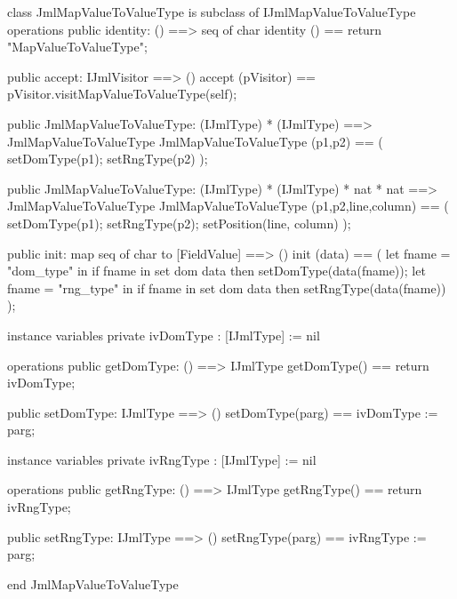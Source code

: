 \begin{vdm_al}
class JmlMapValueToValueType is subclass of IJmlMapValueToValueType
operations
  public identity: () ==> seq of char
  identity () == return "MapValueToValueType";

  public accept: IJmlVisitor ==> ()
  accept (pVisitor) == pVisitor.visitMapValueToValueType(self);

  public JmlMapValueToValueType:
    (IJmlType) *
    (IJmlType) ==> JmlMapValueToValueType
  JmlMapValueToValueType (p1,p2) == 
    ( setDomType(p1);
      setRngType(p2) );

  public JmlMapValueToValueType:
    (IJmlType) *
    (IJmlType) *
    nat *
    nat ==> JmlMapValueToValueType
  JmlMapValueToValueType (p1,p2,line,column) == 
    ( setDomType(p1);
      setRngType(p2);
      setPosition(line, column) );

  public init: map seq of char to [FieldValue] ==> ()
  init (data) ==
    ( let fname = "dom_type" in
        if fname in set dom data
        then setDomType(data(fname));
      let fname = "rng_type" in
        if fname in set dom data
        then setRngType(data(fname)) );

instance variables
  private ivDomType : [IJmlType] := nil

operations
  public getDomType: () ==> IJmlType
  getDomType() == return ivDomType;

  public setDomType: IJmlType ==> ()
  setDomType(parg) == ivDomType := parg;

instance variables
  private ivRngType : [IJmlType] := nil

operations
  public getRngType: () ==> IJmlType
  getRngType() == return ivRngType;

  public setRngType: IJmlType ==> ()
  setRngType(parg) == ivRngType := parg;

end JmlMapValueToValueType
\end{vdm_al}


